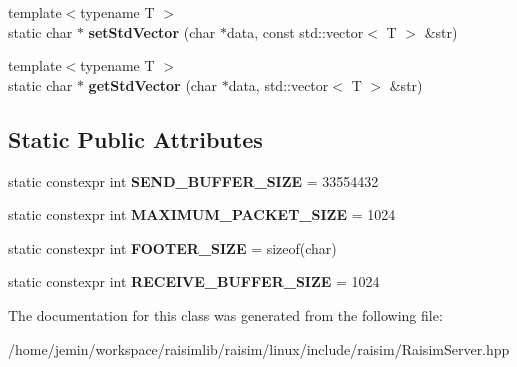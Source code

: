 \begin{DoxyCompactItemize}
\item 
\mbox{\label{classraisim_1_1RaisimServer_ab39166cc49f701f2b397a059b391281d}} 
{\footnotesize template$<$typename T $>$ }\\static char $\ast$ {\bfseries set\+Std\+Vector} (char $\ast$data, const std\+::vector$<$ T $>$ \&str)
\item 
\mbox{\label{classraisim_1_1RaisimServer_aba03b88f4647024ec94fa6740ebdb942}} 
{\footnotesize template$<$typename T $>$ }\\static char $\ast$ {\bfseries get\+Std\+Vector} (char $\ast$data, std\+::vector$<$ T $>$ \&str)
\end{DoxyCompactItemize}
\subsection*{Static Public Attributes}
\begin{DoxyCompactItemize}
\item 
\mbox{\label{classraisim_1_1RaisimServer_a8a09ce26868b942f3c985fbe5f7b9a37}} 
static constexpr int {\bfseries S\+E\+N\+D\+\_\+\+B\+U\+F\+F\+E\+R\+\_\+\+S\+I\+ZE} = 33554432
\item 
\mbox{\label{classraisim_1_1RaisimServer_a41a73c63e381b1ec4dcd80250a4f121c}} 
static constexpr int {\bfseries M\+A\+X\+I\+M\+U\+M\+\_\+\+P\+A\+C\+K\+E\+T\+\_\+\+S\+I\+ZE} = 1024
\item 
\mbox{\label{classraisim_1_1RaisimServer_aeb67ca99e4c695fa574611266a649d35}} 
static constexpr int {\bfseries F\+O\+O\+T\+E\+R\+\_\+\+S\+I\+ZE} = sizeof(char)
\item 
\mbox{\label{classraisim_1_1RaisimServer_a4cfac6be0756bc2777b1c2d6a13e41a4}} 
static constexpr int {\bfseries R\+E\+C\+E\+I\+V\+E\+\_\+\+B\+U\+F\+F\+E\+R\+\_\+\+S\+I\+ZE} = 1024
\end{DoxyCompactItemize}


The documentation for this class was generated from the following file\+:\begin{DoxyCompactItemize}
\item 
/home/jemin/workspace/raisimlib/raisim/linux/include/raisim/Raisim\+Server.\+hpp\end{DoxyCompactItemize}
